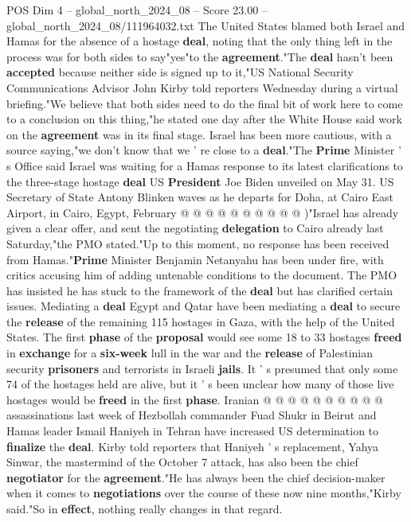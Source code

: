 \begin{textsample}{POS Dim 4 – global\_north\_2024\_08 – Score 23.00 – global\_north\_2024\_08/111964032.txt}  \label{ex:f4_pos_157}
The United States blamed both Israel and Hamas for the absence of a hostage \textbf{deal}, noting that the only thing left in the process was for both sides to say"yes"to the \textbf{agreement}."The \textbf{deal} hasn't been \textbf{accepted} because neither side is signed up to it,"US National Security Communications Advisor John Kirby told reporters Wednesday during a virtual briefing."We believe that both sides need to do the final bit of work here to come to a conclusion on this thing,"he stated one day after the White House said work on the \textbf{agreement} was in its final stage.
Israel has been more cautious, with a source saying,"we don't know that we ' re close to a \textbf{deal}."The \textbf{Prime} Minister ' s Office said Israel was waiting for a Hamas response to its latest clarifications to the three-stage hostage \textbf{deal} US \textbf{President} Joe Biden unveiled on May 31.
US Secretary of State Antony Blinken waves as he departs for Doha, at Cairo East Airport, in Cairo, Egypt, February @ @ @ @ @ @ @ @ @ @ )"Israel has already given a clear offer, and sent the negotiating \textbf{delegation} to Cairo already last Saturday,"the PMO stated."Up to this moment, no response has been received from Hamas."\textbf{Prime} Minister Benjamin Netanyahu has been under fire, with critics accusing him of adding untenable conditions to the document.
The PMO has insisted he has stuck to the framework of the \textbf{deal} but has clarified certain issues.
Mediating a \textbf{deal} Egypt and Qatar have been mediating a \textbf{deal} to secure the \textbf{release} of the remaining 115 hostages in Gaza, with the help of the United States.
The first \textbf{phase} of the \textbf{proposal} would see some 18 to 33 hostages \textbf{freed} in \textbf{exchange} for a \textbf{six-week} lull in the war and the \textbf{release} of Palestinian security \textbf{prisoners} and terrorists in Israeli \textbf{jails}.
It ' s presumed that only some 74 of the hostages held are alive, but it ' s been unclear how many of those live hostages would be \textbf{freed} in the first \textbf{phase}.
Iranian @ @ @ @ @ @ @ @ @ @ assassinations last week of Hezbollah commander Fuad Shukr in Beirut and Hamas leader Ismail Haniyeh in Tehran have increased US determination to \textbf{finalize} the \textbf{deal}.
Kirby told reporters that Haniyeh ' s replacement, Yahya Sinwar, the mastermind of the October 7 attack, has also been the chief \textbf{negotiator} for the \textbf{agreement}."He has always been the chief decision-maker when it comes to \textbf{negotiations} over the course of these now nine months,"Kirby said."So in \textbf{effect}, nothing really changes in that regard.

\end{textsample}
